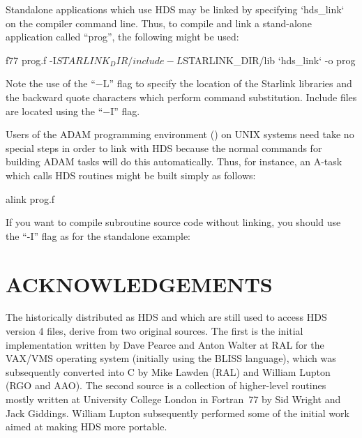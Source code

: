 \documentclass[twoside,11pt]{starlink}
\providecommand{\qt}[1]{``#1''}
\begin{document}
Standalone applications which use HDS may be linked by specifying `hds\_link`
on the compiler command line. Thus, to compile and link a stand-alone
application called \qt{prog}, the following might be used:

\begin{small}
\begin{terminalv}
f77 prog.f -I$STARLINK_DIR/include -L$STARLINK_DIR/lib `hds_link` -o prog
\end{terminalv}
\end{small}

Note the use of the \qt{$-$L} flag to specify the location of the Starlink
libraries and the backward quote characters which perform command
substitution. Include files are located using the \qt{$-$I} flag.

Users of the ADAM programming environment () on UNIX
systems need take no special steps in order to link with HDS because
the normal commands for building ADAM tasks will do this
automatically. Thus, for instance, an A-task which calls HDS routines
might be built simply as follows:

\begin{small}
\begin{terminalv}
alink prog.f
\end{terminalv}
\end{small}

If you want to compile subroutine source code without linking, you should use
the \qt{-I} flag as for the standalone example:

\begin{small}
\end{small}

\section{ACKNOWLEDGEMENTS}

The  historically distributed as
HDS and which are still used to access HDS version 4 files, derive from
two original sources. The first is the initial
implementation written by Dave Pearce and Anton Walter at RAL for the
VAX/VMS operating system (initially using the BLISS language), which
was subsequently converted into C by Mike Lawden (RAL) and William
Lupton (RGO and AAO). The second source is a collection of
higher-level routines mostly written at University College London in
Fortran~77 by Sid Wright and Jack Giddings. William Lupton
subsequently performed some of the initial work aimed at making HDS
more portable.
\end{document}
